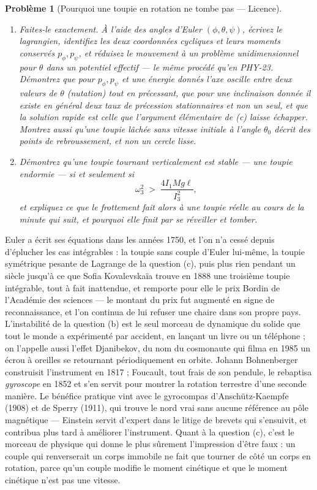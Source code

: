\documentclass[11pt]{article}
\newtheorem{problem}{Problème}
\begin{document}
\begin{problem}[{Pourquoi une toupie en rotation ne tombe pas --- Licence}]
\begin{enumerate}
\item[(d)] Faites-le exactement. À l'aide des angles d'Euler $ (\phi,\theta,\psi) $, écrivez le
lagrangien, identifiez les deux coordonnées cycliques et leurs moments conservés
$ p_{\phi}, p_{\psi} $, et réduisez le mouvement à un problème unidimensionnel pour
$ \theta $ dans un potentiel effectif --- le même procédé qu'en PHY-23. Démontrez que pour
$ p_{\phi}, p_{\psi} $ et une énergie donnés l'axe oscille entre deux valeurs de $ \theta $
(nutation) tout en précessant, que pour une inclinaison donnée il existe en général \textit{deux}
taux de précession stationnaires et non un seul, et que la solution rapide est celle que
l'argument élémentaire de (c) laisse échapper. Montrez aussi qu'une toupie lâchée sans vitesse
initiale à l'angle $ \theta_{0} $ décrit des points de rebroussement, et non un cercle
lisse.
\item[(e)] Démontrez qu'une toupie tournant verticalement est stable --- une toupie \og{} endormie \fg{} --- si et
seulement si
\[ \omega_{3}^{2} \;>\; \frac{4 I_{1} M g \ell}{I_{3}^{2}}, \]
et expliquez ce que le frottement fait alors à une toupie réelle au cours de la minute qui suit,
et pourquoi elle finit par se réveiller et tomber.
\end{enumerate}

\end{problem}

\noindent Euler a écrit ses équations dans les années 1750, et l'on n'a cessé depuis
d'éplucher les cas intégrables : la toupie sans couple d'Euler lui-même, la toupie symétrique
pesante de Lagrange de la question (c), puis plus rien pendant un siècle jusqu'à ce que Sofia
Kovalevskaïa trouve en 1888 une troisième toupie intégrable, tout à fait inattendue, et remporte
pour elle le prix Bordin de l'Académie des sciences --- le montant du prix fut augmenté en signe de
reconnaissance, et l'on continua de lui refuser une chaire dans son propre pays. L'instabilité de
la question (b) est le seul morceau de dynamique du solide que tout le monde a expérimenté par
accident, en lançant un livre ou un téléphone ; on l'appelle aussi l'effet Djanibekov, du nom du
cosmonaute qui filma en 1985 un écrou à oreilles se retournant périodiquement en orbite. Johann
Bohnenberger construisit l'instrument en 1817 ; Foucault, tout frais de son pendule, le rebaptisa
\textit{gyroscope} en 1852 et s'en servit pour montrer la rotation terrestre d'une seconde manière.
Le bénéfice pratique vint avec le gyrocompas d'Anschütz-Kaempfe (1908) et de Sperry (1911), qui
trouve le nord vrai sans aucune référence au pôle magnétique --- Einstein servit d'expert dans le
litige de brevets qui s'ensuivit, et contribua plus tard à améliorer l'instrument. Quant à la
question (c), c'est le morceau de physique qui donne le plus sûrement l'impression d'être faux :
un couple qui renverserait un corps immobile ne fait que tourner de côté un corps en rotation,
parce qu'un couple modifie le moment cinétique et que le moment cinétique n'est pas une
vitesse.
\end{document}
